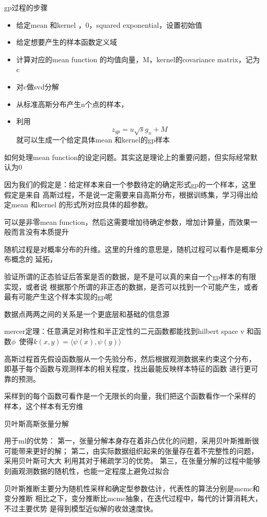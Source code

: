 \documentclass[a4paper, 12pt, CJKnumber, UTF8, openany,nofonts, fancyhdr]{ctexbook}
\begin{document}
gp过程的步骤
\begin{itemize}
\item 给定mean 和kernel ，0，squared exponential，设置初始值
\item  给定想要产生的样本函数定义域
\item 计算对应的mean function 的均值向量，M，kernel的covariance matrix，记为c
\item 对c做svd分解
\item 从标准高斯分布产生n个点的样本，
  \item 利用$$
z_{g p}=u \sqrt{s} g_{n}+M
$$ 就可以生成一个给定具体mean 和kernel的gp样本
 \end{itemize}

 如何处理mean function的设定问题。其实这是理论上的重要问题，但实际经常默认为0

 因为我们的假定是：给定样本来自一个参数待定的确定形式gp的一个样本，这里假定是来自
 高斯过程，不是说一定需要来自高斯分布，根据训练集，学习得出给定mean 和kernel
 的形式所对应具体的超参数。

 可以是非零mean function，然后这需要增加待确定参数，增加计算量，而效果一般而言没有本质提升


 随机过程是对概率分布的升维。这里的升维的意思是，随机过程可以看作是概率分布概念的
 延拓，

 验证所谓的正态验证后答案是否的数据，是不是可以真的来自一个gp样本的有限实现，或者说
 根据那个所谓的非正态的数据，是否可以找到一个可能产生，或者最有可能产生这个样本实现的gp呢

 数据点两两之间的关系是一个更底层和基础的信息源

 mercer定理：任意满足对称性和半正定性的二元函数都能找到hilbert space v 和函数$\phi$\
 使得$k(x, y)=\langle\psi(x), \psi(y)\rangle$


 高斯过程首先假设函数服从一个先验分布，然后根据观测数据来约束这个分布，
 即基于每个函数与观测样本的相关程度，找出最能反映样本特征的函数
 进行更可靠的预测。

 采样到的每个函数可看作是一个无限长的向量，我们把这个函数看作一个采样的
 样本，这个样本有无穷维

 贝叶斯高斯张量分解

 用于ml的优势：
 第一，张量分解本身存在着非凸优化的问题，采用贝叶斯推断很可能带来更好的解；
 第二，由实际数据组织起来的张量存在着不完整性的问题，采用贝叶斯可大大
 利用其对于稀疏学习的优势。
 第三，在张量分解的过程中能够刻画观测数据的随机性，也能一定程度上避免过拟合

 贝叶斯推断主要分为随机性采样和确定型参数估计，代表性的算法分别是mcmc和变分推断
 相比之下，变分推断比mcmc抽象，在迭代过程中，每代的计算消耗大，不过主要优势
 是得到模型近似解的收敛速度快。
\end{document}
